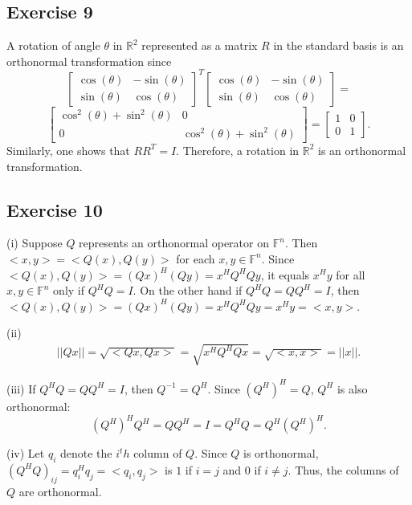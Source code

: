 \documentclass[11.5pt, letterpaper, bibtotoc,
    tablecaptionabove, figurecaptionabove]{article}
\begin{document}
\subsection*{Exercise 9}
A rotation of angle $\theta$ in $\mathbb R^2$ represented as a matrix $R$ 
in the standard basis is an orthonormal transformation since
\[
    \begin{bmatrix}
        \cos(\theta) & -\sin(\theta)\\
        \sin(\theta) & \cos(\theta)
    \end{bmatrix}^T
    \begin{bmatrix}
       \cos(\theta) & -\sin(\theta)\\
       \sin(\theta) & \cos(\theta)
    \end{bmatrix} = 
\]
\[
    \begin{bmatrix}
        \cos^2(\theta)+\sin^2(\theta) & 0\\
        0 & \cos^2(\theta)+\sin^2(\theta)
    \end{bmatrix} = 
    \begin{bmatrix}
        1 & 0\\
        0 & 1
    \end{bmatrix}.
 \]
Similarly, one shows that $RR^T=I$.
Therefore, a rotation in $\mathbb R^2$ is an orthonormal transformation.

\subsection*{Exercise 10}
(i) 
Suppose $Q$ represents an orthonormal operator on $\mathbb F^n$.
Then $<x,y>=<Q(x),Q(y)>$ for each $x,y\in\mathbb F^n$.
Since $<Q(x),Q(y)> = (Qx)^H(Qy)=x^HQ^HQy$, it equals $x^Hy$ for all $x,y\in\mathbb F^n$
only if $Q^HQ=I$.
On the other hand if $Q^HQ=QQ^H=I$, then
$<Q(x),Q(y)>=(Qx)^H(Qy)=x^HQ^HQy=x^Hy=<x,y>$.

(ii)
\begin{align*}
    ||Qx||=\sqrt{<Qx,Qx>}=\sqrt{x^HQ^HQx}=\sqrt{<x,x>}=||x||.
\end{align*}

(iii)
If $Q^HQ=QQ^H=I$, then $Q^{-1}=Q^H$.
Since $(Q^H)^H=Q$, $Q^H$ is also orthonormal:
\begin{equation*}
    (Q^H)^HQ^H=QQ^H=I=Q^HQ=Q^H(Q^H)^H.
\end{equation*}

(iv)
Let $q_i$ denote the $i^th$ column of $Q$.
Since $Q$ is orthonormal, 
$(Q^HQ)_{ij}=q_i^Hq_j=<q_i,q_j>$ is $1$ if $i=j$ and $0$ if $i\neq j$.
Thus, the columns of $Q$ are orthonormal.
\end{document}
